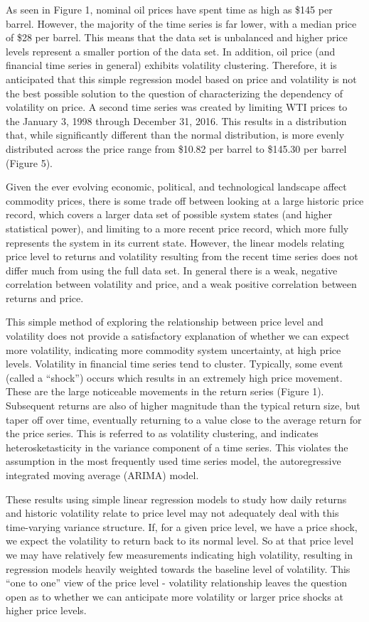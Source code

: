 \documentclass[]{article}
\begin{document}
As seen in Figure 1, nominal oil prices have spent time as high as \$145
per barrel. However, the majority of the time series is far lower, with
a median price of \$28 per barrel. This means that the data set is
unbalanced and higher price levels represent a smaller portion of the
data set. In addition, oil price (and financial time series in general)
exhibits volatility clustering. Therefore, it is anticipated that this
simple regression model based on price and volatility is not the best
possible solution to the question of characterizing the dependency of
volatility on price. A second time series was created by limiting WTI
prices to the January 3, 1998 through December 31, 2016. This results in
a distribution that, while significantly different than the normal
distribution, is more evenly distributed across the price range from
\$10.82 per barrel to \$145.30 per barrel (Figure 5).

Given the ever evolving economic, political, and technological landscape
affect commodity prices, there is some trade off between looking at a
large historic price record, which covers a larger data set of possible
system states (and higher statistical power), and limiting to a more
recent price record, which more fully represents the system in its
current state. However, the linear models relating price level to
returns and volatility resulting from the recent time series does not
differ much from using the full data set. In general there is a weak,
negative correlation between volatility and price, and a weak positive
correlation between returns and price.

This simple method of exploring the relationship between price level and
volatility does not provide a satisfactory explanation of whether we can
expect more volatility, indicating more commodity system uncertainty, at
high price levels. Volatility in financial time series tend to cluster.
Typically, some event (called a ``shock'') occurs which results in an
extremely high price movement. These are the large noticeable movements
in the return series (Figure 1). Subsequent returns are also of higher
magnitude than the typical return size, but taper off over time,
eventually returning to a value close to the average return for the
price series. This is referred to as volatility clustering, and
indicates heterosketasticity in the variance component of a time series.
This violates the assumption in the most frequently used time series
model, the autoregressive integrated moving average (ARIMA) model.

These results using simple linear regression models to study how daily
returns and historic volatility relate to price level may not adequately
deal with this time-varying variance structure. If, for a given price
level, we have a price shock, we expect the volatility to return back to
its normal level. So at that price level we may have relatively few
measurements indicating high volatility, resulting in regression models
heavily weighted towards the baseline level of volatility. This ``one to
one'' view of the price level - volatility relationship leaves the
question open as to whether we can anticipate more volatility or larger
price shocks at higher price levels.
\end{document}
